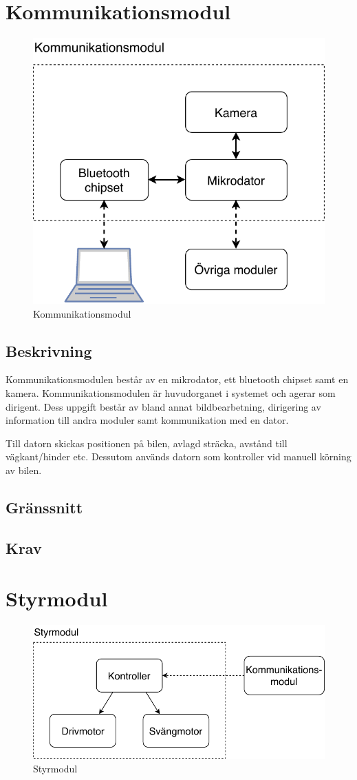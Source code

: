 \documentclass[kravspec/krav.tex]{subfiles}
\begin{document}
\clearpage
\section{Kommunikationsmodul}
\begin{figure}[H]
    \centering
    \includegraphics[width=0.6\linewidth]{kravspec/figures/kommunikationsmodul.pdf}
    \caption{Kommunikationsmodul}
    \label{fig:kommunikationsmodul}
\end{figure}
\subsection{Beskrivning}
Kommunikationsmodulen består av en mikrodator, ett bluetooth chipset samt en
kamera. Kommunikationsmodulen är huvudorganet i systemet och agerar som
dirigent. Dess uppgift består av bland annat bildbearbetning, dirigering av
information till andra moduler samt kommunikation med en dator.

Till datorn skickas positionen på bilen, avlagd sträcka, avstånd till
vägkant/hinder etc. Dessutom används datorn som kontroller vid manuell körning
av bilen.
\subsection{Gränssnitt}
\subsection{Krav}
\begin{reqlist}
    \req{}
\end{reqlist}
\clearpage
\section{Styrmodul}
\begin{figure}[h]
    \centering
    \includegraphics[width=0.6\linewidth]{kravspec/figures/styrmodul.pdf}
    \caption{Styrmodul}
    \label{fig:styrmodul}
\end{figure}
\end{document}
